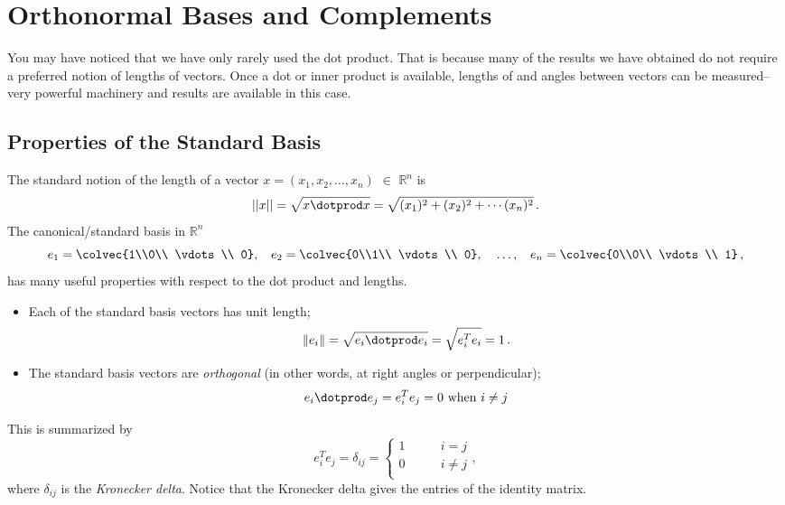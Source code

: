 \chapter{Orthonormal Bases and Complements}\label{orthonormalbases}

You may have noticed that we have only rarely used the dot product. That is because many of the
results we have obtained do not require a preferred notion of lengths of vectors. Once a dot or inner product
is available, lengths of and angles between vectors can be measured--very powerful machinery and results are available
in this case.

\section{Properties of the Standard Basis}

The standard notion of the length of a vector $x=(x_1,x_2,\ldots,x_n)$ $\in$ ${\mathbb R}^n$ is 
\[||x||=\sqrt{x\dotprod x}=\sqrt{(x_1)^2+(x_2)^2+\cdots(x_n)^2}\, .\]
The canonical/standard basis in ${\mathbb R}^n$
\[
e_1=\colvec{1\\0\\ \vdots \\ 0}, \phantom{X}
e_2=\colvec{0\\1\\ \vdots \\ 0}, \phantom{X} \ldots, 
\phantom{X} e_n=\colvec{0\\0\\ \vdots \\ 1}\, ,
\]
has many useful properties with respect to the dot product and lengths.
\begin{itemize}
\item Each of the standard basis vectors has unit length;
\[
\|e_i\|=\sqrt{e_i\dotprod e_i}=\sqrt{e_i^Te_i}=1\, .\]
\item The standard basis vectors are \emph{orthogonal}\label{orthogonal} (in other words, at right angles or perpendicular); 
\[
e_i\dotprod e_j = e_i^Te_j=0 \text{ when } i\neq j
\]
\end{itemize}
This is summarized by
\[
e_i^Te_j=\delta_{ij}=\left\{ \begin{array}{cc}
1 & \qquad i=j \\
0 & \qquad i\neq j \\
\end{array}\right. ,
\]
where $\delta_{ij}$ is the \emph{Kronecker delta}.  Notice that the Kronecker delta gives the entries of the identity matrix.

